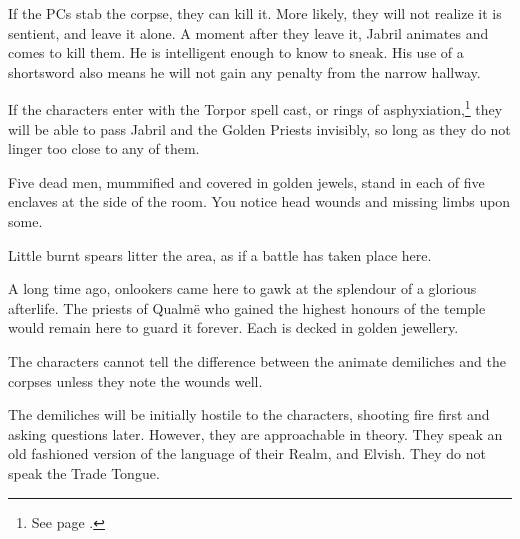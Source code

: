 \begin{multicols}{2}
\begin{boxtext}
\end{boxtext}

If the PCs stab the corpse, they can kill it.
More likely, they will not realize it is sentient, and leave it alone.
A moment after they leave it, Jabril animates and comes to kill them.
He is intelligent enough to know to sneak.
His use of a shortsword also means he will not gain any penalty from the narrow hallway.

If the characters enter with the Torpor spell cast, or rings of asphyxiation,\footnote{See page \pageref{ring_asphyxiation}.} they will be able to pass Jabril and the Golden Priests invisibly, so long as they do not linger too close to any of them.




\begin{boxtext}

	Five dead men, mummified and covered in golden jewels, stand in each of five enclaves at the side of the room.
	You notice head wounds and missing limbs upon some.

	Little burnt spears litter the area, as if a battle has taken place here.

\end{boxtext}

A long time ago, onlookers came here to gawk at the splendour of a glorious afterlife.  The priests of Qualm\"{e} who gained the highest honours of the temple would remain here to guard it forever.  Each is decked in golden jewellery.


The characters cannot tell the difference between the animate demiliches and the corpses unless they note the wounds well.

The demiliches will be initially hostile to the characters, shooting fire first and asking questions later.  However, they are approachable in theory.  They speak an old fashioned version of the language of their Realm, and Elvish.  They do not speak the Trade Tongue.


\begin{exampletext}


\end{exampletext}
\end{multicols}
